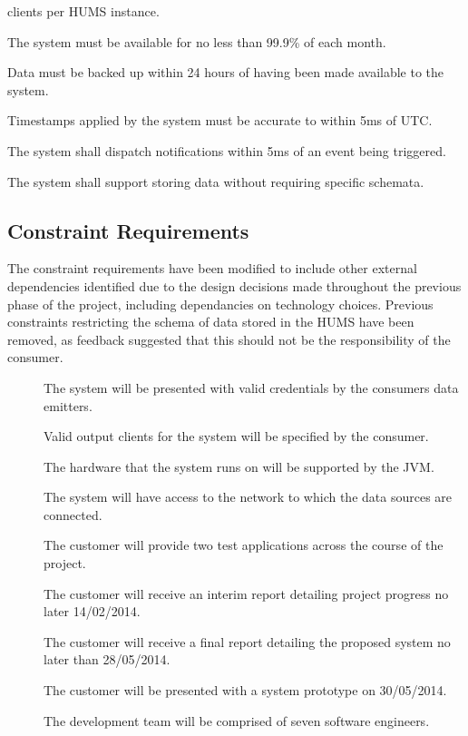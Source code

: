 \begin{description}
	clients per HUMS instance. 
	\item[\nfr{9}] The system must be available for no less than 99.9\% of 
	each month.
	\item[\nfr{10}]  Data must be backed up within 24 hours of having been 
	made available to the system.
	 \item[\nfr{11}] Timestamps applied by the system must be accurate to 
	within 5ms of UTC.
	\item[\nfr{12}]  The system shall dispatch notifications within 5ms of an 
	event being triggered.
	\item[\nfr{13}] The system shall support storing data without requiring 
	specific schemata.
\end{description}

\subsection{Constraint Requirements}
The constraint requirements have been modified to include other external dependencies identified due to the design decisions made throughout the previous phase of the project, including dependancies on technology choices. Previous constraints restricting the schema of data stored in the HUMS have been removed, as feedback suggested that this should not be the responsibility of the consumer.
\begin{description}
	\item[]  The system will be presented with valid credentials 	by the consumers data emitters.
	\item[]  Valid output clients for the system will be specified 		by the consumer.	
	\item[]  The hardware that the system runs on will be 			supported by the JVM.
	\item[]  The system will have access to the network to which 	the data sources are connected.
	\item[]  The customer will provide two test applications 		across the course of the project.
	\item[]  The customer will receive an interim report detailing 	project progress no later 14/02/2014.
	\item[] The customer will receive a final report detailing the 	proposed system no later than 28/05/2014. 
	\item[]  The customer will be presented with a system 		prototype on 30/05/2014.
	\item[] The development team will be comprised of seven 		software engineers.
\end{description}

